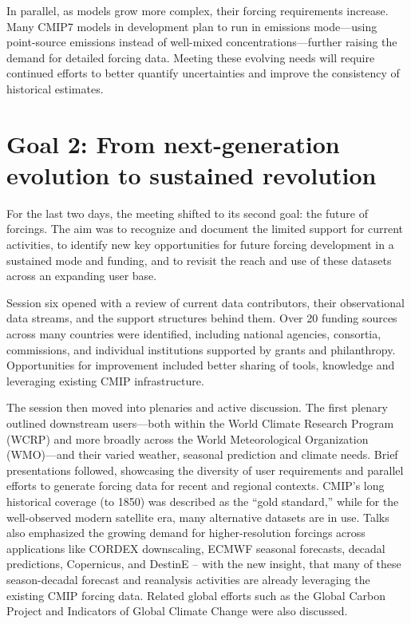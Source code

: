 \documentclass{ametsocV6.1}
\begin{document}
In parallel, as models grow more complex, their forcing requirements increase. Many CMIP7 models in development plan to run in emissions mode—using point-source emissions instead of well-mixed concentrations—further raising the demand for detailed forcing data. Meeting these evolving needs will require continued efforts to better quantify uncertainties and improve the consistency of historical estimates.

\section*{Goal 2: From next-generation evolution to sustained revolution}
For the last two days, the meeting shifted to its second goal: the future of forcings. The aim was to recognize and document the limited support for current activities, to identify new key opportunities for future forcing development in a sustained mode and funding, and to revisit the reach and use of these datasets across an expanding user base.

Session six opened with a review of current data contributors, their observational data streams, and the support structures behind them. Over 20 funding sources across many countries were identified, including national agencies, consortia, commissions, and individual institutions supported by grants and philanthropy. Opportunities for improvement included better sharing of tools, knowledge and leveraging existing CMIP infrastructure.

The session then moved into plenaries and active discussion. The first plenary outlined downstream users—both within the World Climate Research Program (WCRP) and more broadly across the World Meteorological Organization (WMO)—and their varied weather, seasonal prediction and climate needs. Brief presentations followed, showcasing the diversity of user requirements and parallel efforts to generate forcing data for recent and regional contexts. CMIP’s long historical coverage (to 1850) was described as the ``gold standard,'' while for the well-observed modern satellite era, many alternative datasets are in use. Talks also emphasized the growing demand for higher-resolution forcings across applications like CORDEX downscaling, ECMWF seasonal forecasts, decadal predictions, Copernicus, and DestinE – with the new insight, that many of these season-decadal forecast and reanalysis activities are already leveraging the existing CMIP forcing data. Related global efforts such as the Global Carbon Project \citep{friedlingstein_global_2024} and Indicators of Global Climate Change \citep{forster_indicators_2024} were also discussed.
\end{document}
